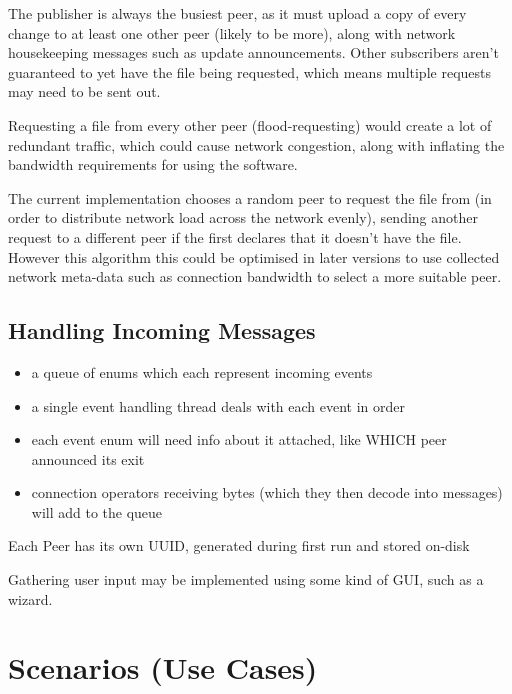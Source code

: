 \documentclass[12pt,a4paper,]{adreport}
\begin{document}
The publisher is always the busiest peer, as it must upload a copy of
every change to at least one other peer (likely to be more), along with
network housekeeping messages such as update announcements. Other
subscribers aren't guaranteed to yet have the file being requested,
which means multiple requests may need to be sent out.

Requesting a file from every other peer (flood-requesting) would create
a lot of redundant traffic, which could cause network congestion, along
with inflating the bandwidth requirements for using the software.

The current implementation chooses a random peer to request the file
from (in order to distribute network load across the network evenly),
sending another request to a different peer if the first declares that
it doesn't have the file. However this algorithm this could be optimised
in later versions to use collected network meta-data such as connection
bandwidth to select a more suitable peer.

\section{Handling Incoming Messages}\label{handling-incoming-messages}

\begin{itemize}
\itemsep1pt\parskip0pt
\item
  a queue of enums which each represent incoming events
\item
  a single event handling thread deals with each event in order
\item
  each event enum will need info about it attached, like WHICH peer
  announced its exit
\item
  connection operators receiving bytes (which they then decode into
  messages) will add to the queue
\end{itemize}

Each Peer has its own UUID, generated during first run and stored
on-disk

Gathering user input may be implemented using some kind of GUI, such as
a wizard.

\chapter{Scenarios (Use Cases)}\label{scenarios-use-cases}
\end{document}
